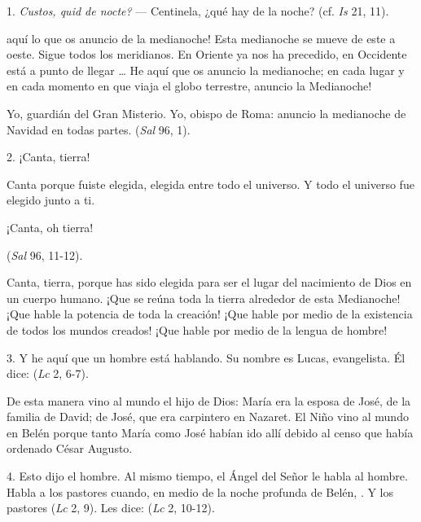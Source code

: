 
\begin{body}
	1. \emph{Custos, quid de nocte?} --- Centinela, ¿qué hay de la noche? (cf. \emph{Is} 21, 11).
	
	 aquí lo que os anuncio de la medianoche! Esta medianoche se mueve de este a oeste. Sigue todos los meridianos. En Oriente ya nos ha precedido, en Occidente está a punto de llegar \ldots{} He aquí que os anuncio la medianoche; en cada lugar y en cada momento en que viaja el globo terrestre, anuncio la Medianoche!
	
	Yo, guardián del Gran Misterio. Yo, obispo de Roma: anuncio la medianoche de Navidad en todas partes.  (\emph{Sal} 96, 1).
	
	2. ¡Canta, tierra!
	
	Canta porque fuiste elegida, elegida entre todo el universo. Y todo el universo fue elegido junto a ti.
	
	¡Canta, oh tierra!
	
	 (\emph{Sal} 96, 11-12).
	
	Canta, tierra, porque has sido elegida para ser el lugar del nacimiento de Dios en un cuerpo humano. ¡Que se reúna toda la tierra alrededor de esta Medianoche! ¡Que hable la potencia de toda la creación! ¡Que hable por medio de la existencia de todos los mundos creados! ¡Que hable por medio de la lengua de hombre!
	
	3. Y he aquí que un hombre está hablando. Su nombre es Lucas, evangelista. Él dice:  (\emph{Lc} 2, 6-7).
	
	De esta manera vino al mundo el hijo de Dios: María era la esposa de José, de la familia de David; de José, que era carpintero en Nazaret. El Niño vino al mundo en Belén porque tanto María como José habían ido allí debido al censo que había ordenado César Augusto.
	
	4. Esto dijo el hombre. Al mismo tiempo, el Ángel del Señor le habla al hombre. Habla a los pastores cuando, en medio de la noche profunda de Belén, . Y los pastores  (\emph{Lc} 2, 9). Les dice:  (\emph{Lc} 2, 10-12).
	

\end{body}

